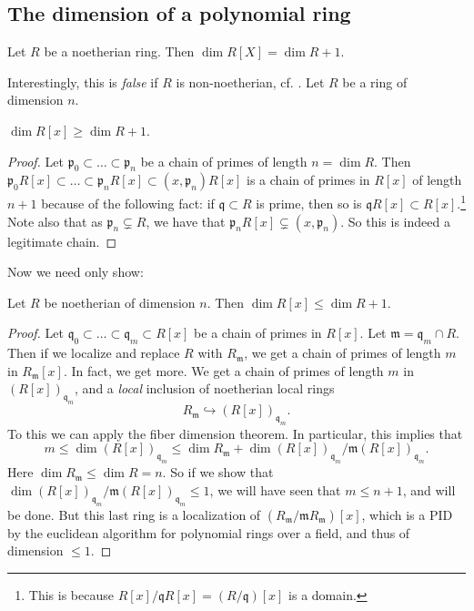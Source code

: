 \subsection{The dimension of a polynomial ring}

\begin{theorem} 
Let $R$ be a noetherian ring. Then $\dim R[X] = \dim R+1$.
\end{theorem} 

Interestingly, this is \emph{false} if $R$ is non-noetherian, cf. \cite{}.
Let $R$ be a ring of dimension $n$. 

\begin{lemma} 
$\dim R[x] \geq \dim R+1$.
\end{lemma} 
\begin{proof} 
Let $\mathfrak{p}_0 \subset \dots \subset \mathfrak{p}_n$ be a chain of primes of
length $n = \dim R$. Then $\mathfrak{p}_0 R[x] \subset \dots \subset
\mathfrak{p}_n R[x] \subset (x, \mathfrak{p}_n)R[x]$ is a chain of primes in
$R[x]$ of length $n+1$ because of the following fact: if $\mathfrak{q} \subset
R$ is prime, then so is $\mathfrak{q}R[x] \subset R[x]$.\footnote{This is
because $R[x]/\mathfrak{q}R[x] = (R/\mathfrak{q})[x]$ is a domain.} Note also
that as $\mathfrak{p}_n \subsetneq R$, we have that $\mathfrak{p}_n R[x]
\subsetneq (x, \mathfrak{p}_n)$. So this is indeed a legitimate chain. 
\end{proof} 

Now we need only show:
\begin{lemma} 
Let $R$ be noetherian of dimension $n$. Then $\dim R[x] \leq \dim R+1$.
\end{lemma} 
\begin{proof} 
Let $\mathfrak{q}_0 \subset \dots \subset \mathfrak{q}_m \subset R[x]$ be a chain of primes
in $R[x]$. Let $\mathfrak{m} = \mathfrak{q}_m \cap R$. Then if we localize and
replace $R$ with $R_{\mathfrak{m}}$, we get a chain of primes of length $m$ in
$R_{\mathfrak{m}}[x]$. 
In fact, we get more. We get a chain of primes of length $m$ in
$(R[x])_{\mathfrak{q}_m}$, and a \emph{local } inclusion of noetherian local rings
\[ R_{\mathfrak{m}} \hookrightarrow (R[x])_{\mathfrak{q}_m} . \]
To this we can apply the fiber dimension theorem. In particular, this implies
that
\[ m \leq \dim (R[x])_{\mathfrak{q}_m} \leq \dim R_{\mathfrak{m}} + \dim
(R[x])_{\mathfrak{q}_m} /\mathfrak{m} (R[x])_{\mathfrak{q}_m}. \]
Here $\dim R_{\mathfrak{m}} \leq \dim R = n$. So if we show that $\dim
(R[x])_{\mathfrak{q}_m} /\mathfrak{m} (R[x])_{\mathfrak{q}_m} \leq 1$, we will
have seen that $m \leq n+1$, and will be done. But this last ring is a
localization of $(R_{\mathfrak{m}}/\mathfrak{m}R_{\mathfrak{m}})[x]$, which is
a PID by the euclidean algorithm for polynomial rings over a field, and thus of
dimension  $\leq 1$.
\end{proof} 

